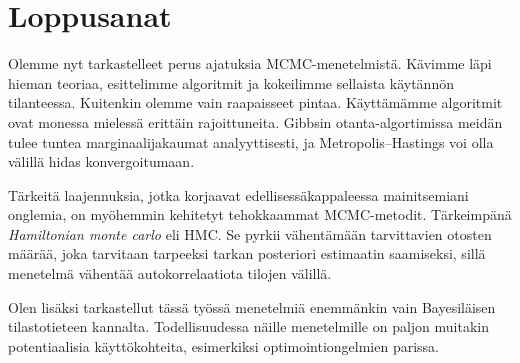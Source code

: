 \chapter{Loppusanat}

Olemme nyt tarkastelleet perus ajatuksia MCMC-menetelmistä. Kävimme läpi hieman teoriaa, esittelimme algoritmit ja kokeilimme sellaista käytännön tilanteessa. Kuitenkin olemme vain raapaisseet pintaa. Käyttämämme algoritmit ovat monessa mielessä erittäin rajoittuneita. Gibbsin otanta-algortimissa meidän tulee tuntea marginaalijakaumat analyyttisesti, ja Metropolis--Hastings voi olla välillä hidas konvergoitumaan. 

Tärkeitä laajennuksia, jotka korjaavat edellisessäkappaleessa mainitsemiani onglemia, on myöhemmin kehitetyt tehokkaammat MCMC-metodit. Tärkeimpänä \textit{Hamiltonian monte carlo} eli HMC. Se pyrkii vähentämään tarvittavien otosten määrää, joka tarvitaan tarpeeksi tarkan posteriori estimaatin saamiseksi, sillä menetelmä vähentää autokorrelaatiota tilojen välillä.

Olen lisäksi tarkastellut tässä työssä menetelmiä enemmänkin vain Bayesiläisen tilastotieteen kannalta. Todellisuudessa näille menetelmille on paljon muitakin potentiaalisia käyttökohteita, esimerkiksi optimointiongelmien parissa.

